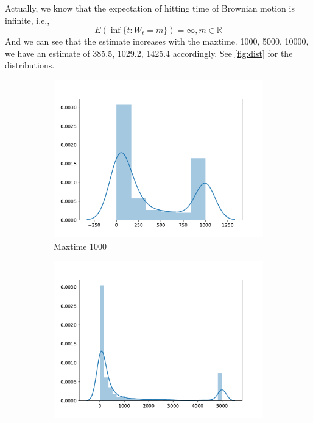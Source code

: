 \begin{subproblem}[\roman*)]
{            Actually, we know that the expectation of hitting time of Brownian
            motion is infinite, i.e.,
            \[E(\inf{\{t:W_t=m\}})=\infty,m\in\mathbb R\]
            And we can see that the estimate increases with the maxtime.
        } 1000, 5000, 10000,
        we have an estimate
        of 385.5, 1029.2, 1425.4 accordingly. See \cref{fig:dist}
        for the distributions.
        \begin{figure}[h]
            \centering
            \begin{subfigure}[b]{0.3\textwidth}
                \includegraphics[width=\textwidth]{max=1000}
                \caption{Maxtime 1000}
            \end{subfigure}
            \begin{subfigure}[b]{0.3\textwidth}
                \includegraphics[width=\textwidth]{max=5000}

\end{subfigure}
\end{figure}
\end{subproblem}
